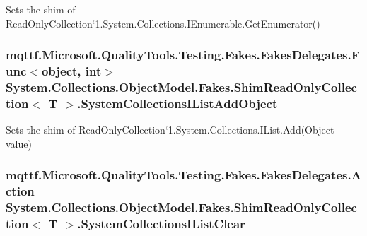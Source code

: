 Sets the shim of Read\-Only\-Collection`1.System.\-Collections.\-I\-Enumerable.\-Get\-Enumerator()

\hypertarget{class_system_1_1_collections_1_1_object_model_1_1_fakes_1_1_shim_read_only_collection_3_01_t_01_4_aceac64b62b1d242755cfc5d406931a1f}{
\subsubsection[{System\-Collections\-I\-List\-Add\-Object}]{\setlength{\rightskip}{0pt plus 5cm}mqttf.\-Microsoft.\-Quality\-Tools.\-Testing.\-Fakes.\-Fakes\-Delegates.\-Func$<$object, int$>$ System.\-Collections.\-Object\-Model.\-Fakes.\-Shim\-Read\-Only\-Collection$<$ T $>$.System\-Collections\-I\-List\-Add\-Object\hspace{0.3cm}{\ttfamily [set]}}}\label{class_system_1_1_collections_1_1_object_model_1_1_fakes_1_1_shim_read_only_collection_3_01_t_01_4_aceac64b62b1d242755cfc5d406931a1f}


Sets the shim of Read\-Only\-Collection`1.System.\-Collections.\-I\-List.\-Add(\-Object value)

\hypertarget{class_system_1_1_collections_1_1_object_model_1_1_fakes_1_1_shim_read_only_collection_3_01_t_01_4_afb3d8ac61057d43805674e5fb8a62250}{
\subsubsection[{System\-Collections\-I\-List\-Clear}]{\setlength{\rightskip}{0pt plus 5cm}mqttf.\-Microsoft.\-Quality\-Tools.\-Testing.\-Fakes.\-Fakes\-Delegates.\-Action System.\-Collections.\-Object\-Model.\-Fakes.\-Shim\-Read\-Only\-Collection$<$ T $>$.System\-Collections\-I\-List\-Clear\hspace{0.3cm}{\ttfamily [set]}}}\label{class_system_1_1_collections_1_1_object_model_1_1_fakes_1_1_shim_read_only_collection_3_01_t_01_4_afb3d8ac61057d43805674e5fb8a62250}


